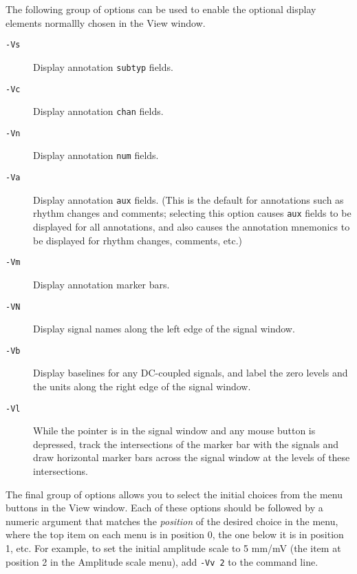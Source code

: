 \documentclass[twoside]{book}
\begin{document}
The following group of options can be used to enable the optional display
elements normallly chosen in the {\sf View} window.

\begin{description}
\item[{\tt -Vs}]
Display annotation {\tt subtyp} fields.

\item[{\tt -Vc}]
Display annotation {\tt chan} fields.

\item[{\tt -Vn}]
Display annotation {\tt num} fields.

\item[{\tt -Va}]
Display annotation {\tt aux} fields.  (This is the default for
annotations such as rhythm changes and comments;  selecting this
option causes {\tt aux} fields to be displayed for all annotations,
and also causes the annotation mnemonics to be displayed for rhythm
changes, comments, etc.)

\item[{\tt -Vm}]
Display annotation marker bars.

\item[{\tt -VN}]
Display signal names along the left edge of the signal window.

\item[{\tt -Vb}]
Display baselines for any DC-coupled signals, and label the zero
levels and the units along the right edge of the signal window.

\item[{\tt -Vl}]
While the pointer is in the signal window and any mouse button is
depressed, track the intersections of the marker bar with the signals
and draw horizontal marker bars across the signal window at the levels
of these intersections.
\end{description}

The final group of options allows you to select the initial choices
from the menu buttons in the {\sf View} window.  Each of these options
should be followed by a numeric argument that matches the
\emph{position} of the desired choice in the menu, where the top item
on each menu is in position 0, the one below it is in position 1, etc.
For example, to set the initial amplitude scale to 5 mm/mV (the item
at position 2 in the {\sf Amplitude scale} menu), add {\tt -Vv 2} to
the command line.
\end{document}
